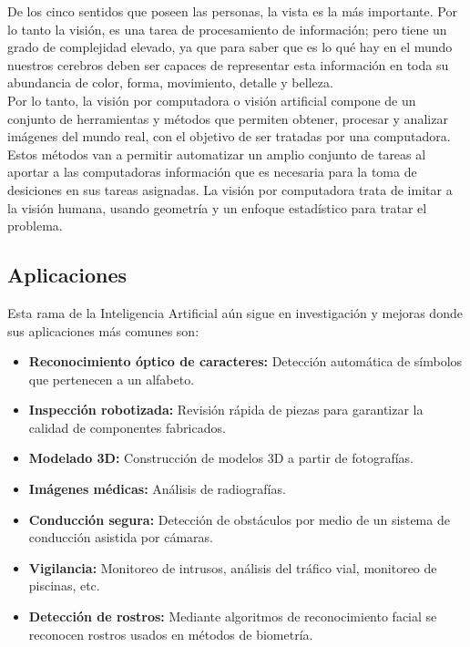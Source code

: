 De los cinco sentidos que poseen las personas, la vista es la más importante. Por lo tanto la visión, es una tarea de procesamiento de información; pero tiene un grado de complejidad elevado, ya que para saber que es lo qué hay en el mundo nuestros cerebros deben ser capaces de representar esta información en toda su abundancia de color, forma, movimiento, detalle y belleza. \cite{iaarbook:artificialvision}\\

Por lo tanto, la visión por computadora o visión artificial compone de un conjunto de herramientas y métodos que permiten obtener, procesar y analizar imágenes del mundo real, con el objetivo de ser tratadas por una computadora. Estos métodos van a permitir automatizar un amplio conjunto de tareas al aportar a las computadoras información que es necesaria para la toma de desiciones en sus tareas asignadas. La visión por computadora trata de imitar a la visión humana, usando geometría y un enfoque estadístico para tratar el problema.\\

\subsection{Aplicaciones}
Esta rama de la Inteligencia Artificial aún sigue en investigación y mejoras donde sus aplicaciones más comunes son:

\begin{itemize}
    \item \textbf{Reconocimiento óptico de caracteres:} Detección automática de símbolos que pertenecen a un alfabeto.
    \item \textbf{Inspección robotizada:} Revisión rápida de piezas para garantizar la calidad de componentes fabricados.
    \item \textbf{Modelado 3D:} Construcción de modelos 3D a partir de fotografías.
    \item \textbf{Imágenes médicas:} Análisis de radiografías.
    \item \textbf{Conducción segura:} Detección de obstáculos por medio de un sistema de conducción asistida por cámaras.
    \item \textbf{Vigilancia:} Monitoreo de intrusos, análisis del tráfico vial, monitoreo de piscinas, etc.
    \item \textbf{Detección de rostros:} Mediante algoritmos de reconocimiento facial se reconocen rostros usados en métodos de biometría.
\end{itemize}

